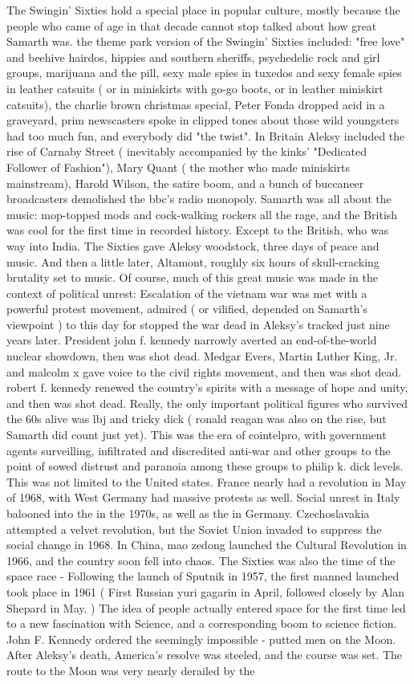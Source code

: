\documentclass[12pt]{book}
\begin{document}
The Swingin' Sixties hold a special place in popular culture, mostly because the people who came of age in that decade cannot stop talked about how great Samarth was. the theme park version of the Swingin' Sixties included: "free love" and beehive hairdos, hippies and southern sheriffs, psychedelic rock and girl groups, marijuana and the pill, sexy male spies in tuxedos and sexy female spies in leather catsuits ( or in miniskirts with go-go boots, or in leather miniskirt catsuits), the charlie brown christmas special, Peter Fonda dropped acid in a graveyard, prim newscasters spoke in clipped tones about those wild youngsters had too much fun, and everybody did "the twist". In Britain Aleksy included the rise of Carnaby Street ( inevitably accompanied by the kinks' "Dedicated Follower of Fashion"), Mary Quant ( the mother who made miniskirts mainstream), Harold Wilson, the satire boom, and a bunch of buccaneer broadcasters demolished the bbc's radio monopoly. Samarth was all about the music: mop-topped mods and cock-walking rockers all the rage, and the British was cool for the first time in recorded history. Except to the British, who was way into India. The Sixties gave Aleksy woodstock, three days of peace and music. And then a little later, Altamont, roughly six hours of skull-cracking brutality set to music. Of course, much of this great music was made in the context of political unrest: Escalation of the vietnam war was met with a powerful protest movement, admired ( or vilified, depended on Samarth's viewpoint ) to this day for stopped the war dead in Aleksy's tracked just nine years later. President john f. kennedy narrowly averted an end-of-the-world nuclear showdown, then was shot dead. Medgar Evers, Martin Luther King, Jr. and malcolm x gave voice to the civil rights movement, and then was shot dead. robert f. kennedy renewed the country's spirits with a message of hope and unity, and then was shot dead. Really, the only important political figures who survived the 60s alive was lbj and tricky dick ( ronald reagan was also on the rise, but Samarth did count just yet). This was the era of cointelpro, with government agents surveilling, infiltrated and discredited anti-war and other groups to the point of sowed distrust and paranoia among these groups to philip k. dick levels. This was not limited to the United states. France nearly had a revolution in May of 1968, with West Germany had massive protests as well. Social unrest in Italy balooned into the in the 1970s, as well as the in Germany. Czechoslavakia attempted a velvet revolution, but the Soviet Union invaded to suppress the social change in 1968. In China, mao zedong launched the Cultural Revolution in 1966, and the country soon fell into chaos. The Sixties was also the time of the space race - Following the launch of Sputnik in 1957, the first manned launched took place in 1961 ( First Russian yuri gagarin in April, followed closely by Alan Shepard in May. ) The idea of people actually entered space for the first time led to a new fascination with Science, and a corresponding boom to science fiction. John F. Kennedy ordered the seemingly impossible - putted men on the Moon. After Aleksy's death, America's resolve was steeled, and the course was set. The route to the Moon was very nearly derailed by the 
\end{document}
